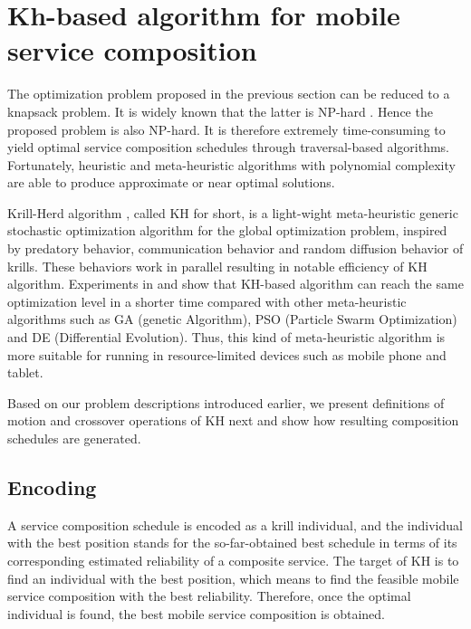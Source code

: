\documentclass[journal]{IEEEtran}
\begin{document}
\section{Kh-based algorithm for mobile service composition}

The optimization problem proposed in the previous section can be reduced to a knapsack problem. It is widely known that the latter is NP-hard \cite{papadimitriou1998combinatorial}. Hence the proposed problem is also NP-hard. It is therefore extremely time-consuming to yield optimal service composition schedules through traversal-based algorithms. Fortunately, heuristic and meta-heuristic algorithms with polynomial complexity are able to produce approximate or near optimal solutions.

Krill-Herd algorithm \cite{gandomi2012krill}, called KH for short, is a light-wight meta-heuristic generic stochastic optimization algorithm for the global optimization problem, inspired by predatory behavior, communication behavior and random diffusion behavior of krills. 
These behaviors work in parallel resulting in notable efficiency of KH algorithm. Experiments in \cite{gandomi2012krill} and \cite{wang2014stud} show that KH-based algorithm can reach the same optimization level in a shorter time compared with other meta-heuristic algorithms such as GA (genetic  Algorithm), PSO (Particle Swarm Optimization) and DE (Differential Evolution). Thus, this kind of meta-heuristic algorithm is more suitable for running in resource-limited devices such as mobile phone and tablet.

Based on our problem descriptions introduced earlier, we present definitions of motion and crossover operations of KH next and show how resulting composition schedules are generated.

\subsection{Encoding}
A service composition schedule is encoded as a krill individual, and the individual with the best position stands for the so-far-obtained best schedule in terms of its corresponding estimated reliability of a composite service. The target of KH is to find an individual with the best position, which means to find the feasible mobile service composition with the best reliability. Therefore, once the optimal individual is found, the best mobile service composition is obtained.
\end{document}
